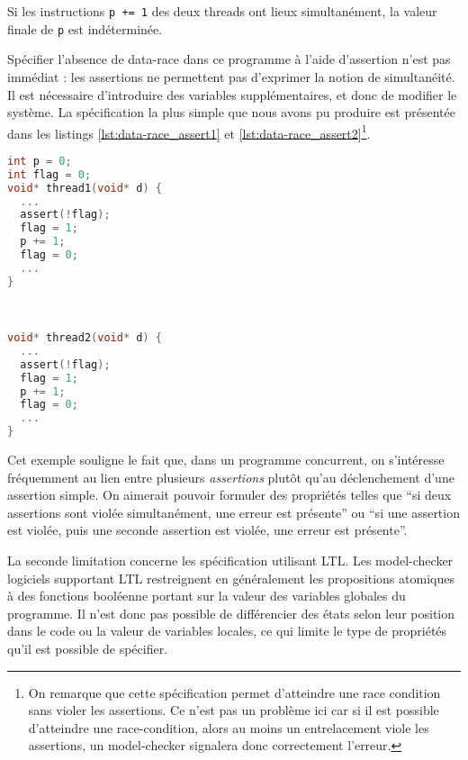 Si les instructions \texttt{p += 1} des deux threads ont lieux simultanément, la
valeur finale de \texttt{p} est indéterminée.

Spécifier l'absence de data-race dans ce programme à l'aide d'assertion n'est
pas immédiat : les assertions ne permettent pas d'exprimer la notion de
simultanéité. Il est nécessaire d'introduire des variables supplémentaires, et
donc de modifier le système. La spécification la plus simple que nous avons pu
produire est présentée dans les listings \ref{lst:data-race_assert1} et
\ref{lst:data-race_assert2}\footnote{On remarque que cette spécification permet
  d'atteindre une race condition sans violer les assertions. Ce n'est pas un
problème ici car si il est possible d'atteindre une race-condition, alors au
moins un entrelacement viole les assertions, un model-checker signalera donc
correctement l'erreur.}.

\noindent\begin{minipage}{.45\textwidth}
  \begin{lstlisting}[language=C, frame=single, caption=Thread 1,
    label=lst:data-race_assert1]
int p = 0;
int flag = 0;
void* thread1(void* d) {
  ...
  assert(!flag);
  flag = 1;
  p += 1;
  flag = 0;
  ...
}
\end{lstlisting}
\end{minipage}\hfill
\begin{minipage}{.45\textwidth}
\begin{lstlisting}[language=C, frame=single, caption=Thread 2,
    label=lst:data-race_assert2]


void* thread2(void* d) {
  ...
  assert(!flag);
  flag = 1;
  p += 1;
  flag = 0;
  ...
}
\end{lstlisting}
\end{minipage}

Cet exemple souligne le fait que, dans un programme concurrent, on
s'intéresse fréquemment au lien entre plusieurs \emph{assertions} plutôt qu'au
déclenchement d'une assertion simple. On aimerait pouvoir formuler des
propriétés telles que ``si deux assertions sont violée simultanément, une
erreur est présente'' ou ``si une assertion est violée, puis une seconde
assertion est violée, une erreur est présente''.

La seconde limitation concerne les spécification utilisant \ac{LTL}.
Les model-checker logiciels supportant LTL restreignent en généralement les
propositions atomiques à des fonctions booléenne portant sur la valeur des
variables globales du programme. Il n'est donc pas possible de différencier des
états selon leur position dans le code ou la valeur de variables locales, ce qui
limite le type de propriétés qu'il est possible de spécifier.


